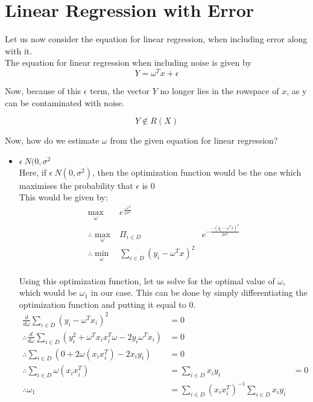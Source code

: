\documentclass[11pt, twosides]{article}
\begin{document}
\section{Linear Regression with Error}
Let us now consider the equation for linear regression, when including error along with it.\\

The equation for linear regression when including noise is given by
\begin{equation*}
    Y = \omega^Tx + \epsilon
\end{equation*}

Now, because of this $\epsilon$ term, the vector $Y$ no longer lies in the rowspace of $x$, as y can be contaminated with noise.

\begin{equation*}
    Y \notin R(X)
\end{equation*}

Now, how do we estimate $\omega$ from the given equation for linear regression?\\

\begin{itemize}
    \item $\epsilon ~ N(0,\sigma^2$\\
    Here, if $\epsilon ~ N(0,\sigma^2)$, then the optimization function would be the one which maximises the probability that $\epsilon$ is 0\\
    This would be given by:\\
    \begin{align*}
        \max_{\omega} & e^{\frac{-\epsilon^2}{2\sigma^2}}\\
        \therefore \max_{\omega} & \Pi_{i \in D} & e^{-\frac{-(y_i - \omega^T x)^2}{2\sigma^2}}\\
        \therefore \min_{\omega} & \sum_{i \in D} (y_i - \omega^T x)^2\\
    \end{align*}
    
    Using this optimization function, let us solve for the optimal value of $\omega$, which would be $\omega_1$ in our case. This can be done by simply differentiating the optimization function and putting it equal to 0.\\
    
    \begin{align*}
        \frac{d}{d\omega} \sum_{i \in D} (y_i - \omega^T x_i)^2 &= 0\\
        \therefore \frac{d}{d\omega} \sum_{i \in D}(y_i^2 + \omega^Tx_ix_i^T\omega - 2y_i\omega^Tx_i) &= 0\\
        \therefore \sum_{i \in D}(0 + 2\omega(x_ix_i^T) - 2x_iy_i) &= 0\\
        \therefore \sum_{i \in D}\omega(x_ix_i^T) &= \sum_{i \in D} x_iy_i &= 0\\
        \therefore \omega_1 &= \sum_{i \in D} (x_ix_i^T)^{-1} \sum_{i \in D} x_iy_i
    \end{align*}
\end{itemize}
\end{document}

